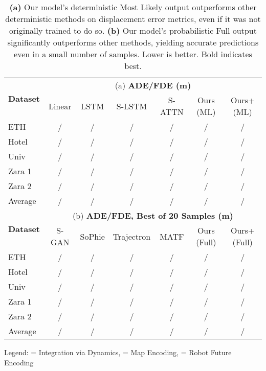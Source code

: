 \documentclass[runningheads]{llncs}
\begin{document}
\begin{table}[t]
\fontsize{8}{8}\selectfont
\centering
\caption{
\textbf{(a)} Our model's deterministic Most Likely output outperforms other deterministic methods on displacement error metrics, even if it was not originally trained to do so.
\textbf{(b)} Our model's probabilistic Full output significantly outperforms other methods, yielding accurate predictions even in a small number of samples.
Lower is better. Bold indicates best.}
\begin{tabular}{l|cccc|cc}
\toprule
\multicolumn{1}{c|}{\multirow{2}{*}{\textbf{Dataset}}} & \multicolumn{6}{c}{(a) \textbf{ADE/FDE (m)}} \Bstrut \\ \cline{2-7} 
\multicolumn{1}{c|}{}                         & Linear      & LSTM        & S-LSTM \cite{GuptaJohnsonEtAl2018} & S-ATTN \cite{VemulaMuellingEtAl2018} & Ours (ML) & Ours+ (ML) \TBstrut \\ \midrule
ETH                                           & / & / & / & /      & /  & /             \\
Hotel                                         & / & / & / & /      & /  & /             \\
Univ                                          & / & / & / & /      & /  & /             \\
Zara 1                                        & / & / & / & /      &  / & /             \\
Zara 2                                        & / & / & / & /      & /  & /             \\ \midrule
Average                                       & / & / & / & /      &  / & /  \Bstrut   \\ \hline
\hline
\multicolumn{1}{c|}{\multirow{2}{*}{\textbf{Dataset}}} & \multicolumn{6}{c}{(b) \textbf{ADE/FDE, Best of 20 Samples (m)}}  \TBstrut \\ \cline{2-7} 
\multicolumn{1}{c|}{}                         & S-GAN \cite{GuptaJohnsonEtAl2018} & SoPhie \cite{SadeghianKosarajuEtAl2019} & Trajectron \cite{IvanovicPavone2019} & MATF \cite{ZhaoXuEtAl2019} & Ours (Full) & Ours+ (Full) \TBstrut \\ \midrule
ETH                                           & /  & /   & /  & / & / & /  \\
Hotel                                         & /  & /   & /  & / & / & /  \\
Univ                                          & /  & /   & /  & / & / & / \\
Zara 1                                        & /  & /   & /  & / & / & / \\
Zara 2                                        & /  & /   & /  & / & / & /  \\ \midrule
Average                                       & /  & /   & /  & / & / & /  \\ \bottomrule
\end{tabular}
\label{tab:deterministic_fde}
\label{tab:generative_BoN}

Legend:  = Integration via Dynamics,  = Map Encoding,  = Robot Future Encoding
\end{table}
\end{document}
